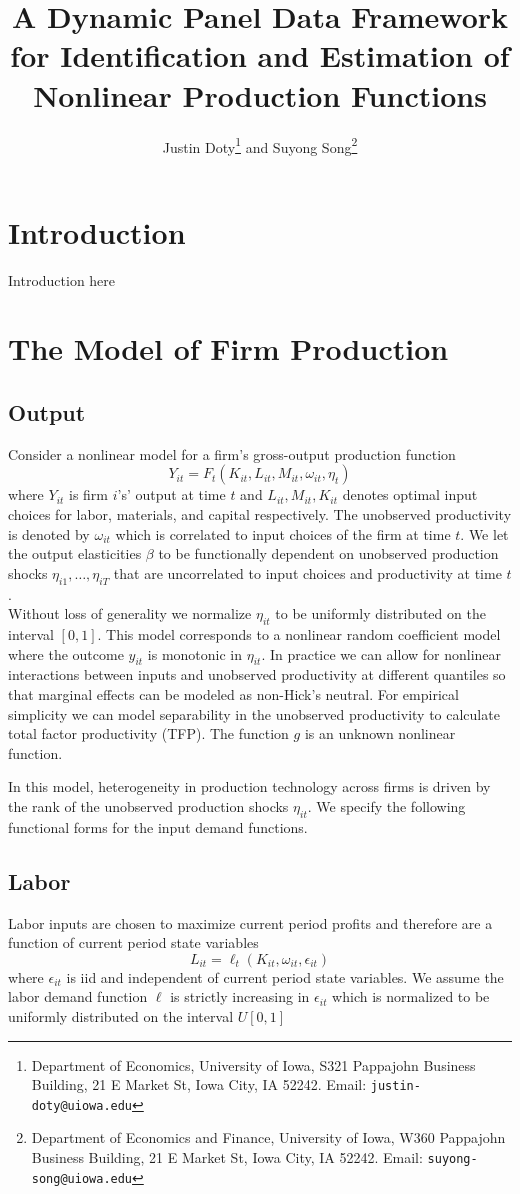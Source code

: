 \documentclass{article}
\title{A Dynamic Panel Data Framework for Identification and Estimation of Nonlinear Production Functions}
\author{Justin Doty\thanks{Department of Economics, University of Iowa, S321 Pappajohn Business Building, 21 E Market St, Iowa City, IA 52242. Email: \texttt{justin-doty@uiowa.edu}} and Suyong Song\thanks{Department of Economics and Finance, University of Iowa, W360 Pappajohn Business Building, 21 E Market St, Iowa City, IA 52242. Email: \texttt{suyong-song@uiowa.edu}}
}
\date{\vspace{-5ex}}
\begin{document}
\maketitle{} 
\section{Introduction}
Introduction here
\section{The Model of Firm Production}

\subsection{Output}
Consider a nonlinear model for a firm's gross-output production function
\begin{equation}\label{modelY}
Y_{it}=F_{t}(K_{it}, L_{it}, M_{it}, \omega_{it}, \eta_{t})
\end{equation}
where $Y_{it}$ is firm $i$'s' output at time $t$ and $L_{it}, M_{it}, K_{it}$ denotes optimal input choices for labor, materials, and capital respectively. The unobserved productivity is denoted by $\omega_{it}$ which is correlated to input choices of the firm at time $t$. We let the output elasticities $\beta$ to be functionally dependent on unobserved production shocks $\eta_{i1},\dots, \eta_{iT}$ that are uncorrelated to input choices and productivity at time $t$.\\

Without loss of generality we normalize $\eta_{it}$ to be uniformly distributed on the interval $[0,1]$. This model corresponds to a nonlinear random coefficient model where the outcome $y_{it}$ is monotonic in $\eta_{it}$. In practice we can allow for nonlinear interactions between inputs and unobserved productivity at different quantiles so that marginal effects can be modeled as non-Hick's neutral. For empirical simplicity we can model separability in the unobserved productivity to calculate total factor productivity (TFP). The function $g$ is an unknown nonlinear function.

In this model, heterogeneity in production technology across firms is driven by the rank of the unobserved production shocks $\eta_{it}$. We specify the following functional forms for the input demand functions.

\subsection{Labor} 
Labor inputs are chosen to maximize current period profits and therefore are a function of current period state variables
\begin{equation} \label{modelL}
L_{it}=\ell_{t}(K_{it}, \omega_{it}, \epsilon_{it})
\end{equation}
where $\epsilon_{it}$ is iid and independent of current period state variables. We assume the labor demand function $\ell$ is strictly increasing in $\epsilon_{it}$ which is normalized to be uniformly distributed on the interval $U[0,1]$
\end{document}
